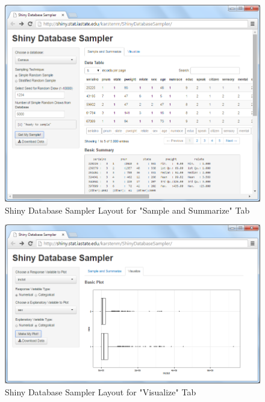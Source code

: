 \documentclass{article}\usepackage[]{graphicx}\usepackage[]{color}
\begin{document}
\begin{figure}[htbp]
\begin{center}
\includegraphics[keepaspectratio=TRUE,width=.99\textwidth]{figure/SampleAndSummarize.png}
\end{center}
\caption{Shiny Database Sampler Layout for "Sample and Summarize" Tab} 
\label{samplesummarizetab}
\end{figure}


\begin{figure}[htbp]
\begin{center}
\includegraphics[keepaspectratio=TRUE,width=.99\textwidth]{figure/Visualize.png}
\end{center}
\caption{Shiny Database Sampler Layout for "Visualize" Tab} 
\label{visualizetab}
\end{figure}
\end{document}
